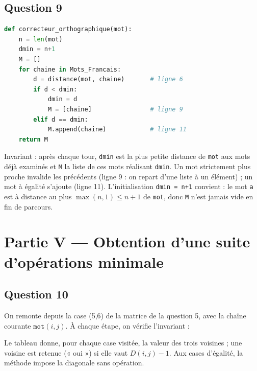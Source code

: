 \documentclass[11pt,a4paper]{article}
\newcommand{\equationajustee}[1]{%
  \sbox{\boiteequation}{$\displaystyle #1$}%
  \ifdim\wd\boiteequation>\linewidth
    \[\resizebox{\linewidth}{!}{\usebox{\boiteequation}}\]%
  \else
    \[#1\]%
  \fi}
\begin{document}
\hypertarget{question-9}{%
\subsection{Question 9}\label{question-9}}

\begin{lstlisting}[language=Python]
def correcteur_orthographique(mot):
    n = len(mot)
    dmin = n+1
    M = []
    for chaine in Mots_Francais:
        d = distance(mot, chaine)       # ligne 6
        if d < dmin:
            dmin = d
            M = [chaine]                # ligne 9
        elif d == dmin:
            M.append(chaine)            # ligne 11
    return M
\end{lstlisting}

Invariant : après chaque tour, \texttt{dmin} est la plus petite distance de \texttt{mot} aux mots déjà examinés et \texttt{M} la liste de ces mots réalisant \texttt{dmin}. Un mot strictement plus proche invalide les précédents (ligne 9 : on repart d'une liste à un élément) ; un mot à égalité s'ajoute (ligne 11). L'initialisation \texttt{dmin\ =\ n+1} convient : le mot \texttt{\textquotesingle{}a\textquotesingle{}} est à distance au plus \(\max(n,1)\le n+1\) de \texttt{mot}, donc \texttt{M} n'est jamais vide en fin de parcours.

\hypertarget{partie-v-obtention-dune-suite-dopuxe9rations-minimale}{%
\section{Partie V --- Obtention d'une suite d'opérations minimale}\label{partie-v-obtention-dune-suite-dopuxe9rations-minimale}}

\hypertarget{question-10}{%
\subsection{Question 10}\label{question-10}}

On remonte depuis la case (5,6) de la matrice de la question 5, avec la chaîne courante \(\texttt{mot}(i,j)\). À chaque étape, on vérifie l'invariant :

\equationajustee{\texttt{mot}(i,j)=\texttt{mot2[:j]}+\texttt{mot1[i:]}}

Le tableau donne, pour chaque case visitée, la valeur des trois voisines ; une voisine est retenue (« oui ») si elle vaut \(D(i,j)-1\). Aux cases d'égalité, la méthode impose la diagonale sans opération.
\end{document}
